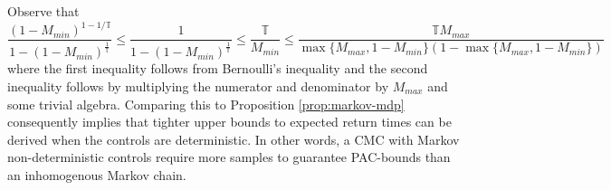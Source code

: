 \documentclass[opre,sglanonrev]{informs4}
\numberwithin{equation}{section}
\newcommand{\Tbb}{\mathbb{T}}
\begin{document}
\begin{APPENDICES}
\begin{remark}
\end{remark}
\begin{remark}
Observe that 
\[
\frac{(1-M_{min})^{1-1/\Tbb}}{1-(1-M_{min})^{\frac{1}{\Tbb}}}\leq\frac{1}{1-(1-M_{min})^{\frac{1}{\Tbb}}}\leq \frac{\Tbb}{M_{min}}\leq \frac{\Tbb M_{max}}{\max\{M_{max},1-M_{min}\}(1-\max\{M_{max},1-M_{min}\})}
\]
where the first inequality follows from Bernoulli's inequality \citep{brannan2006first} and the second inequality follows by multiplying the numerator and denominator by $M_{max}$ and some trivial algebra.
Comparing this to Proposition \ref{prop:markov-mdp} consequently implies that tighter upper bounds to expected return times can be derived when the controls are deterministic. In other words, a CMC with Markov non-deterministic controls require more samples to guarantee PAC-bounds than an inhomogenous Markov chain. 
\end{remark}



\end{APPENDICES}
\end{document}
